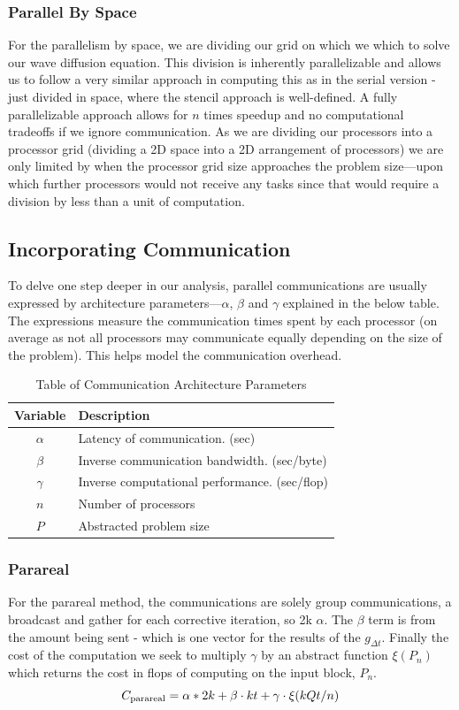 \documentclass[letterpaper,12pt]{article}
\begin{document}
\subsubsection{Parallel By Space}

For the parallelism by space, we are dividing our grid on which we which to solve our wave diffusion equation. This division is inherently parallelizable and allows us to follow a very similar approach in computing this as in the serial version - just divided in space, where the stencil approach is well-defined. A fully parallelizable approach allows for $n$ times speedup and no computational tradeoffs if we ignore communication. As we are dividing our processors into a processor grid (dividing a 2D space into a 2D arrangement of processors) we are only limited by when the processor grid size approaches the problem size---upon which further processors would not receive any tasks since that would require a division by less than a unit of computation.

\subsection{Incorporating Communication}

To delve one step deeper in our analysis, parallel communications are usually expressed by architecture parameters---$\alpha$, $\beta$ and $\gamma$ explained in the below table. The expressions measure the communication times spent by each processor (on average as not all processors may communicate equally depending on the size of the problem). This helps model the communication overhead.

\begin{table}
\centering
\begin{tabular}{|c|l|}
{\bf Variable} & {\bf Description}\\
\hline\hline
$\alpha$ & Latency of communication. (sec)\\
$\beta$ & Inverse communication bandwidth. (sec/byte)\\
$\gamma$ & Inverse computational performance. (sec/flop)\\
$n$ & Number of processors\\
$P$ & Abstracted problem size\\
\hline
\end{tabular}
\caption{Table of Communication Architecture Parameters}
\label{tab:notation}
\end{table}

\subsubsection{Parareal}
For the parareal method, the communications are solely group communications, a broadcast and gather for each corrective iteration, so 2k $\alpha$. The $\beta$ term is from the amount being sent - which is one vector for the results of the $g_{\Delta t}$. Finally the cost of the computation we seek to multiply $\gamma$ by an abstract function $\xi(P_n)$ which returns the cost in flops of computing on the input block, $P_n$.
\[
C_{\textnormal{parareal}} = \alpha*2k + \beta \cdot kt + \gamma \cdot \xi(kQt/n)
\]
\end{document}
